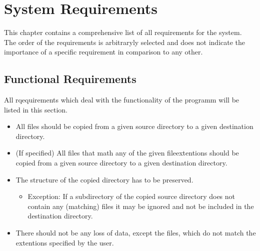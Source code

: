 \chapter{System Requirements}\label{cha:system_requirements}
This chapter contains a comprehensive list of all requirements for the system. 
The order of the requirements is arbitraryly selected and does not indicate the importance
of a specific requirement in comparison to any other.

\section{Functional Requirements}\label{sec:functional_requiremens}
All rqequirements which deal with the functionality of the programm will be listed in this section.

\begin{itemize}
    \item All files should be copied from a given source directory to a given destination directory.
    \item (If specified) All files that math any of the given fileextentions should be copied from a given source directory to a given destination directory.
    \item The structure of the copied directory has to be preserved.
    \begin{itemize}
        \item Exception: If a subdirectory of the copied source directory does not contain any (matching) files it may be ignored and not be included in the destination directory.
    \end{itemize}
    \item There should not be any loss of data, except the files, which do not match the extentions specified by the user.
\end{itemize}
